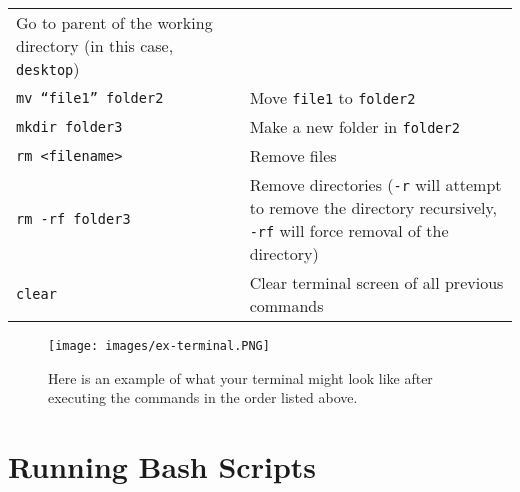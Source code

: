 \documentclass[
]{book}
\begin{document}
\begin{longtable}[]{@{}ll@{}}
\begin{minipage}[t]{0.53\columnwidth}
Go to parent of the working directory (in this case, \texttt{desktop})\strut
\end{minipage}\tabularnewline
\begin{minipage}[t]{0.41\columnwidth}\raggedright
\texttt{mv\ “file1”\ folder2}\strut
\end{minipage} & \begin{minipage}[t]{0.53\columnwidth}\raggedright
Move \texttt{file1} to \texttt{folder2}\strut
\end{minipage}\tabularnewline
\begin{minipage}[t]{0.41\columnwidth}\raggedright
\texttt{mkdir\ folder3}\strut
\end{minipage} & \begin{minipage}[t]{0.53\columnwidth}\raggedright
Make a new folder in \texttt{folder2}\strut
\end{minipage}\tabularnewline
\begin{minipage}[t]{0.41\columnwidth}\raggedright
\texttt{rm\ \textless{}filename\textgreater{}}\strut
\end{minipage} & \begin{minipage}[t]{0.53\columnwidth}\raggedright
Remove files\strut
\end{minipage}\tabularnewline
\begin{minipage}[t]{0.41\columnwidth}\raggedright
\texttt{rm\ -rf\ folder3}\strut
\end{minipage} & \begin{minipage}[t]{0.53\columnwidth}\raggedright
Remove directories (\texttt{-r} will attempt to remove the directory recursively, \texttt{-rf} will force removal of the directory)\strut
\end{minipage}\tabularnewline
\begin{minipage}[t]{0.41\columnwidth}\raggedright
\texttt{clear}\strut
\end{minipage} & \begin{minipage}[t]{0.53\columnwidth}\raggedright
Clear terminal screen of all previous commands\strut
\end{minipage}\tabularnewline
\bottomrule
\end{longtable}

\begin{figure}
\centering
\texttt{[image: images/ex-terminal.PNG]}
\caption{Here is an example of what your terminal might look like after executing the commands in the order listed above.}
\end{figure}

\hypertarget{running-bash-scripts}{%
\section{Running Bash Scripts}\label{running-bash-scripts}}
\end{document}
